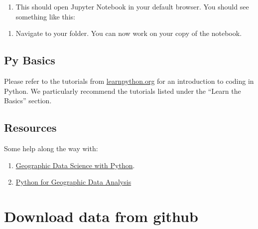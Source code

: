 \documentclass[
  letterpaper,
  DIV=11,
  numbers=noendperiod]{scrreprt}
\providecommand{\tightlist}{%
  \setlength{\itemsep}{0pt}\setlength{\parskip}{0pt}}\usepackage{longtable,booktabs,array}
\begin{document}
\begin{enumerate}
\def\labelenumi{\arabic{enumi}.}
\setcounter{enumi}{5}
\tightlist
\item
  This should open Jupyter Notebook in your default browser. You should
  see something like this:
\end{enumerate}

\begin{enumerate}
\def\labelenumi{\arabic{enumi}.}
\setcounter{enumi}{6}
\tightlist
\item
  Navigate to your folder. You can now work on your copy of the
  notebook.
\end{enumerate}

\section*{Py Basics}\label{py-basics}


Please refer to the tutorials from
\href{https://www.learnpython.org/en/Welcome}{learnpython.org} for an
introduction to coding in Python. We particularly recommend the
tutorials listed under the ``Learn the Basics'' section.

\section*{Resources}\label{resources}


Some help along the way with:

\begin{enumerate}
\def\labelenumi{\arabic{enumi}.}
\item
  \href{https://geographicdata.science/book/intro.html}{Geographic Data
  Science with Python}.
\item
  \href{https://pythongis.org/index.html}{Python for Geographic Data
  Analysis}
\end{enumerate}

\chapter*{Download data from github}\label{download-data-from-github}

\end{document}
